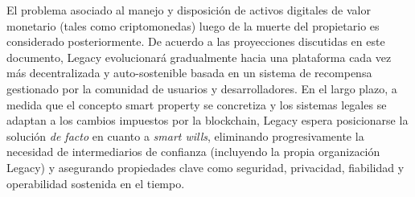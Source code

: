 El problema asociado al manejo y disposición de activos digitales de valor monetario (tales como criptomonedas) luego de la muerte del propietario es considerado posteriormente.
De acuerdo a las proyecciones discutidas en este documento, Legacy evolucionará gradualmente hacia una plataforma cada vez más decentralizada y auto-sostenible basada en un sistema de recompensa gestionado por la comunidad de usuarios y desarrolladores.
En el largo plazo, a medida que el concepto smart property se concretiza y los sistemas legales se adaptan a los cambios impuestos por la blockchain, Legacy espera posicionarse la solución \textit{de facto} en cuanto a \textit{smart wills}, eliminando progresivamente la necesidad de intermediarios de confianza (incluyendo la propia organización Legacy) y asegurando propiedades clave como seguridad, privacidad, fiabilidad y operabilidad sostenida en el tiempo.




